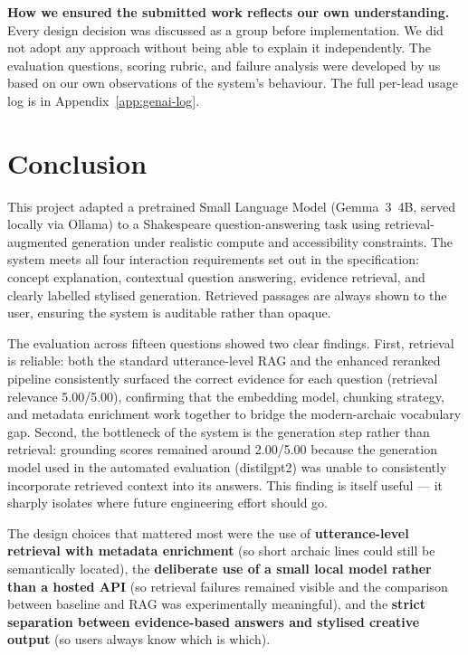 \documentclass[10pt,conference]{IEEEtran}
\begin{document}
\textbf{How we ensured the submitted work reflects our own
understanding.} Every design decision was discussed as a group
before implementation. We did not adopt any approach without being
able to explain it independently. The evaluation questions, scoring
rubric, and failure analysis were developed by us based on our own
observations of the system's behaviour. The full per-lead usage
log is in Appendix~\ref{app:genai-log}.

\section{Conclusion}
\label{sec:conclusion}

This project adapted a pretrained Small Language Model (Gemma~3~4B,
served locally via Ollama) to a Shakespeare question-answering task
using retrieval-augmented generation under realistic compute and
accessibility constraints. The system meets all four interaction
requirements set out in the specification: concept explanation,
contextual question answering, evidence retrieval, and clearly
labelled stylised generation. Retrieved passages are always shown
to the user, ensuring the system is auditable rather than opaque.

The evaluation across fifteen questions showed two clear findings.
First, retrieval is reliable: both the standard utterance-level RAG
and the enhanced reranked pipeline consistently surfaced the
correct evidence for each question (retrieval relevance 5.00/5.00),
confirming that the embedding model, chunking strategy, and metadata
enrichment work together to bridge the modern-archaic vocabulary
gap. Second, the bottleneck of the system is the generation step
rather than retrieval: grounding scores remained around 2.00/5.00
because the generation model used in the automated evaluation
(distilgpt2) was unable to consistently incorporate retrieved
context into its answers. This finding is itself useful --- it
sharply isolates where future engineering effort should go.

The design choices that mattered most were the use of
\textbf{utterance-level retrieval with metadata enrichment} (so
short archaic lines could still be semantically located), the
\textbf{deliberate use of a small local model rather than a hosted
API} (so retrieval failures remained visible and the comparison
between baseline and RAG was experimentally meaningful), and the
\textbf{strict separation between evidence-based answers and
stylised creative output} (so users always know which is which).
\end{document}
